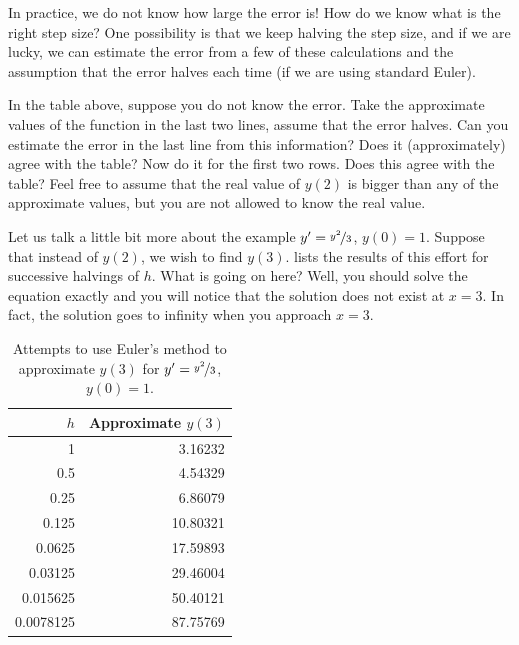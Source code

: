 In practice, we do not know how large the error is!
How do we know what is
the right step size?  One possibility is that we keep halving the step size,
and if we
are lucky, we can estimate the error from a few of these calculations and the
assumption that the error halves each time
(if we are using standard Euler).

\begin{exercise}
In the table above, suppose you do not know the error.  Take
the approximate values of the function in the last two lines,
assume that the error halves.  Can you estimate the
error in the last line from this information?  Does it (approximately) agree with the
table?  Now do it for the first two rows.  Does this agree with the table?
Feel free to assume that the real value of $y(2)$ is bigger than any of the
approximate values, but you are not allowed to know the real value.
\end{exercise}

Let us talk a little bit more about the example
$y' = \nicefrac{y^2}{3}$, $y(0) = 1$.
Suppose that instead of $y(2)$, we wish to find $y(3)$.
lists the results of this effort
for successive halvings of $h$.  What is
going on here?  Well, you should solve the equation exactly and you will
notice that the solution does not exist at $x=3$.  In fact, the solution goes
to infinity when you approach $x=3$.

\begin{table}[h!t]
\mybeginframe
\capstart
\begin{center}
\begin{tabular}{@{}rr@{}}
\toprule
$h$ & Approximate $y(3)$ \\
\midrule
1        & 3.16232 \\
0.5      & 4.54329 \\
0.25     & 6.86079 \\
0.125    & 10.80321 \\
0.0625   & 17.59893 \\
0.03125  & 29.46004 \\
0.015625 & 50.40121 \\
0.0078125& 87.75769 \\
\bottomrule
\end{tabular}
\end{center}
\caption{Attempts to use Euler's method to approximate $y(3)$ for
$y'=\nicefrac{y^2}{3}$, $y(0)=1$.\label{euler-table2:table}}
\myendframe
\end{table}

